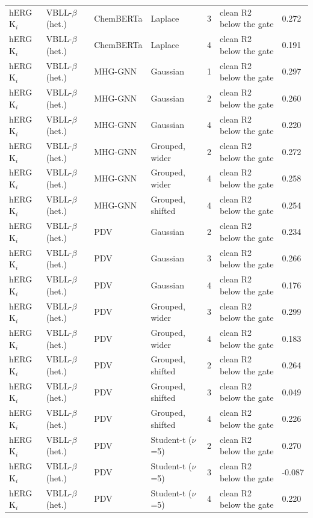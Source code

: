 {\begin{longtable}{llllcll}
hERG K$_i$ & VBLL-$\beta$ (het.) & ChemBERTa & Laplace & 3 & clean R2 below the gate & 0.272 \\
hERG K$_i$ & VBLL-$\beta$ (het.) & ChemBERTa & Laplace & 4 & clean R2 below the gate & 0.191 \\
hERG K$_i$ & VBLL-$\beta$ (het.) & MHG-GNN & Gaussian & 1 & clean R2 below the gate & 0.297 \\
hERG K$_i$ & VBLL-$\beta$ (het.) & MHG-GNN & Gaussian & 2 & clean R2 below the gate & 0.260 \\
hERG K$_i$ & VBLL-$\beta$ (het.) & MHG-GNN & Gaussian & 4 & clean R2 below the gate & 0.220 \\
hERG K$_i$ & VBLL-$\beta$ (het.) & MHG-GNN & Grouped, wider & 2 & clean R2 below the gate & 0.272 \\
hERG K$_i$ & VBLL-$\beta$ (het.) & MHG-GNN & Grouped, wider & 4 & clean R2 below the gate & 0.258 \\
hERG K$_i$ & VBLL-$\beta$ (het.) & MHG-GNN & Grouped, shifted & 4 & clean R2 below the gate & 0.254 \\
hERG K$_i$ & VBLL-$\beta$ (het.) & PDV & Gaussian & 2 & clean R2 below the gate & 0.234 \\
hERG K$_i$ & VBLL-$\beta$ (het.) & PDV & Gaussian & 3 & clean R2 below the gate & 0.266 \\
hERG K$_i$ & VBLL-$\beta$ (het.) & PDV & Gaussian & 4 & clean R2 below the gate & 0.176 \\
hERG K$_i$ & VBLL-$\beta$ (het.) & PDV & Grouped, wider & 3 & clean R2 below the gate & 0.299 \\
hERG K$_i$ & VBLL-$\beta$ (het.) & PDV & Grouped, wider & 4 & clean R2 below the gate & 0.183 \\
hERG K$_i$ & VBLL-$\beta$ (het.) & PDV & Grouped, shifted & 2 & clean R2 below the gate & 0.264 \\
hERG K$_i$ & VBLL-$\beta$ (het.) & PDV & Grouped, shifted & 3 & clean R2 below the gate & 0.049 \\
hERG K$_i$ & VBLL-$\beta$ (het.) & PDV & Grouped, shifted & 4 & clean R2 below the gate & 0.226 \\
hERG K$_i$ & VBLL-$\beta$ (het.) & PDV & Student-t ($\nu$=5) & 2 & clean R2 below the gate & 0.270 \\
hERG K$_i$ & VBLL-$\beta$ (het.) & PDV & Student-t ($\nu$=5) & 3 & clean R2 below the gate & -0.087 \\
hERG K$_i$ & VBLL-$\beta$ (het.) & PDV & Student-t ($\nu$=5) & 4 & clean R2 below the gate & 0.220 \\

\end{longtable}}
